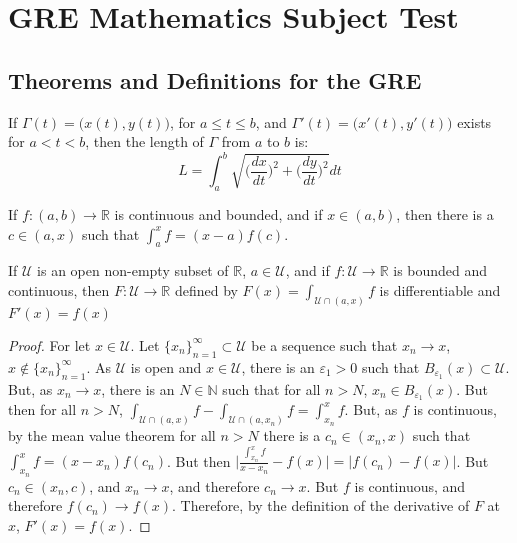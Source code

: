 \documentclass[crop=false,class=book,oneside]{standalone}
\begin{document}
\chapter{GRE Mathematics Subject Test}
\section{Theorems and Definitions for the GRE}
\begin{definition}
If $\Gamma(t) = \big(x(t),y(t)\big)$, for $a\leq t \leq b$, and $\Gamma'(t) = \big(x'(t),y'(t)\big)$ exists for $a<t<b$, then the length of $\Gamma$ from $a$ to $b$ is:
\begin{equation}
    L = \int_{a}^{b}\sqrt{\bigg(\frac{dx}{dt}\bigg)^2+\bigg(\frac{dy}{dt}\bigg)^2}dt
\end{equation}
\end{definition}
\begin{theorem}
If $f:(a,b)\rightarrow \mathbb{R}$ is continuous and bounded, and if $x\in (a,b)$, then there is a $c\in(a,x)$ such that $\int_{a}^{x}f = (x-a)f(c)$.
\end{theorem}
\begin{theorem}
If $\mathcal{U}$ is an open non-empty subset of $\mathbb{R}$,
$a\in \mathcal{U}$, and if $f:\mathcal{U}\rightarrow \mathbb{R}$
is bounded and continuous, then $F:\mathcal{U}\rightarrow \mathbb{R}$
defined by $F(x) = \int_{\mathcal{U}\cap (a,x)}f$ is
differentiable and $F'(x) = f(x)$
\end{theorem}
\begin{proof}
For let $x\in \mathcal{U}$. Let $\{x_n\}_{n=1}^{\infty}\subset \mathcal{U}$
be a sequence such that $x_n \rightarrow x$, $x\notin \{x_n\}_{n=1}^{\infty}$.
As $\mathcal{U}$ is open and $x\in \mathcal{U}$, there is an
$\varepsilon_1>0$ such that $B_{\varepsilon_1}(x)\subset \mathcal{U}$. But, as
$x_n\rightarrow x$, there is an $N\in \mathbb{N}$ such that for all $n>N$,
$x_n\in B_{\varepsilon_1}(x)$. But then for all $n>N$,
$\int_{\mathcal{U}\cap(a,x)}f-\int_{\mathcal{U}\cap(a,x_n)}f=\int_{x_n}^{x}f$.
But, as $f$ is continuous, by the mean value theorem for all $n>N$ there is a
$c_n\in (x_n,x)$ such that $\int_{x_n}^{x}f = (x-x_n)f(c_n)$. But then
$\big|\frac{\int_{x_n}^{x}f}{x-x_n} - f(x)| = |f(c_n)-f(x)|$. But $c_n\in (x_n,c)$,
and $x_n \rightarrow x$, and therefore $c_n \rightarrow x$. But $f$ is continuous,
and therefore $f(c_n)\rightarrow f(x)$. Therefore, by the definition of the
derivative of $F$ at $x$, $F'(x) = f(x)$. 
\end{proof}
\end{document}
